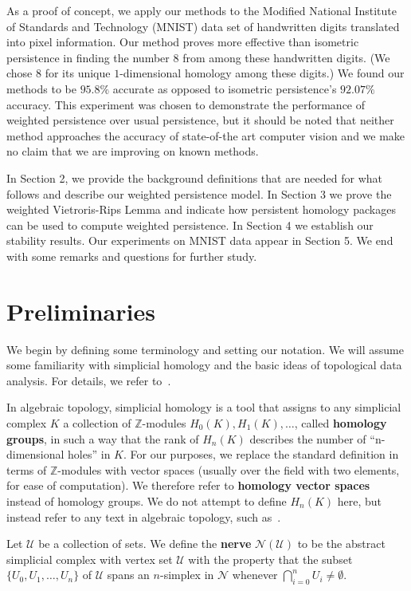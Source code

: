 \documentclass{amsart}
\newtheorem*{fibering lemma}{Fibering Lemma}
\newtheorem*{decomposition lemma}{Decomposition Lemma}
\newtheorem*{hurewicz theorem}{Hurewicz Theorem}
\theoremstyle{definition}
\newcommand{\df}[1]{{{\bf #1}}}
\begin{document}
As a proof of concept, we apply our methods to the Modified National Institute of Standards and Technology (MNIST) data set of handwritten digits translated into pixel information. Our method proves more effective than isometric persistence in finding the number $8$ from among these handwritten digits. (We chose $8$ for its unique $1$-dimensional homology among these digits.) We found our methods to be $95.8\%$ accurate as opposed to isometric persistence's $92.07\%$ accuracy. This experiment was chosen to demonstrate the performance of weighted persistence over usual persistence, but it should be noted that neither method approaches the accuracy of state-of-the art computer vision and we make no claim that we are improving on known methods.

In Section 2, we provide the background definitions that are needed for what follows and describe our weighted persistence model. In Section 3 we prove the weighted Vietroris-Rips Lemma and indicate how persistent homology packages can be used to compute weighted persistence. In Section 4 we establish our stability results. Our experiments on MNIST data appear in Section 5. We end with some remarks and questions for further study.

\section{Preliminaries}

We begin by defining some terminology and setting our notation. We will assume some familiarity with simplicial homology and the basic ideas of topological data analysis. For details, we refer to~\cite{Ede:10,Rotman}.

In algebraic topology, simplicial homology is a tool that assigns to any simplicial complex $K$ a collection of $\mathbb{Z}$-modules $H_0(K), H_1(K),\ldots$, called \df{homology groups}, in such a way that the rank of $H_n(K)$ describes the number of ``n-dimensional holes'' in $K$. For our purposes, we replace the standard definition in terms of $\mathbb{Z}$-modules with vector spaces (usually over the field with two elements, for ease of computation). We therefore refer to \df{homology vector spaces} instead of homology groups. We do not attempt to define $H_n(K)$ here, but instead refer to any text in algebraic topology, such as~\cite{Rotman}.

Let $\mathcal{U}$ be a collection of sets. We define the \df{nerve} $\mathcal{N}(\mathcal{U})$ to be the abstract simplicial complex with vertex set $\mathcal{U}$ with the property that the subset $\{U_0,U_1,\ldots, U_n\}$ of $\mathcal{U}$ spans an $n$-simplex in $\mathcal{N}$ whenever $\bigcap_{i=0}^nU_i\neq\emptyset$. 
\end{document}
